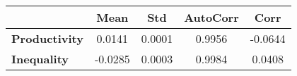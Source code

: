 \begin{tiny}\begin{tabular}{|l|c|c|c|c|}
\hline
&\textbf{Mean}&\textbf{Std}&\textbf{AutoCorr}&\textbf{Corr}\\\hline
\textbf{Productivity}&0.0141&0.0001&0.9956&-0.0644\\\hline
\textbf{Inequality}&-0.0285&0.0003&0.9984&0.0408\\\hline
\end{tabular}
\end{tiny}